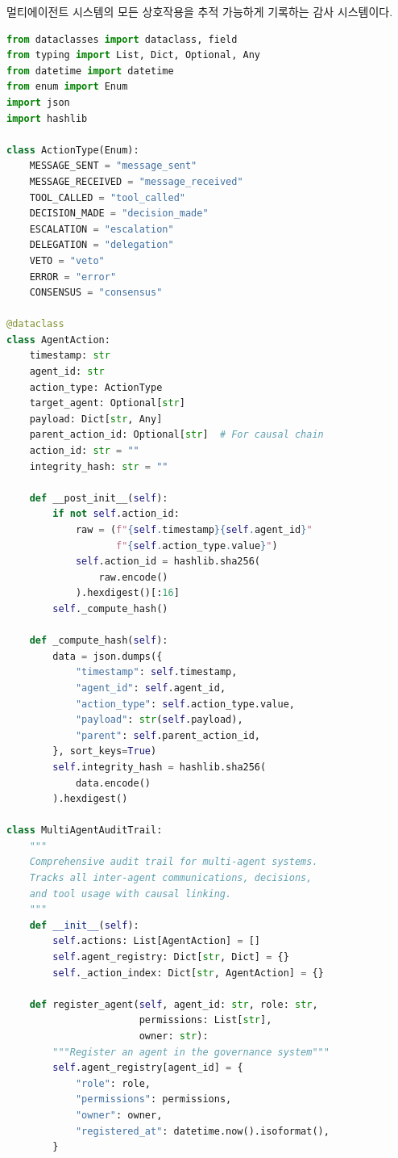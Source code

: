 멀티에이전트 시스템의 모든 상호작용을 추적 가능하게 기록하는 감사 시스템이다.

\begin{lstlisting}[language=Python, caption={멀티에이전트 감사 추적 시스템}, label={lst:multi_agent_audit}]
from dataclasses import dataclass, field
from typing import List, Dict, Optional, Any
from datetime import datetime
from enum import Enum
import json
import hashlib

class ActionType(Enum):
    MESSAGE_SENT = "message_sent"
    MESSAGE_RECEIVED = "message_received"
    TOOL_CALLED = "tool_called"
    DECISION_MADE = "decision_made"
    ESCALATION = "escalation"
    DELEGATION = "delegation"
    VETO = "veto"
    ERROR = "error"
    CONSENSUS = "consensus"

@dataclass
class AgentAction:
    timestamp: str
    agent_id: str
    action_type: ActionType
    target_agent: Optional[str]
    payload: Dict[str, Any]
    parent_action_id: Optional[str]  # For causal chain
    action_id: str = ""
    integrity_hash: str = ""

    def __post_init__(self):
        if not self.action_id:
            raw = (f"{self.timestamp}{self.agent_id}"
                   f"{self.action_type.value}")
            self.action_id = hashlib.sha256(
                raw.encode()
            ).hexdigest()[:16]
        self._compute_hash()

    def _compute_hash(self):
        data = json.dumps({
            "timestamp": self.timestamp,
            "agent_id": self.agent_id,
            "action_type": self.action_type.value,
            "payload": str(self.payload),
            "parent": self.parent_action_id,
        }, sort_keys=True)
        self.integrity_hash = hashlib.sha256(
            data.encode()
        ).hexdigest()

class MultiAgentAuditTrail:
    """
    Comprehensive audit trail for multi-agent systems.
    Tracks all inter-agent communications, decisions,
    and tool usage with causal linking.
    """
    def __init__(self):
        self.actions: List[AgentAction] = []
        self.agent_registry: Dict[str, Dict] = {}
        self._action_index: Dict[str, AgentAction] = {}

    def register_agent(self, agent_id: str, role: str,
                       permissions: List[str],
                       owner: str):
        """Register an agent in the governance system"""
        self.agent_registry[agent_id] = {
            "role": role,
            "permissions": permissions,
            "owner": owner,
            "registered_at": datetime.now().isoformat(),
        }


\end{lstlisting}
